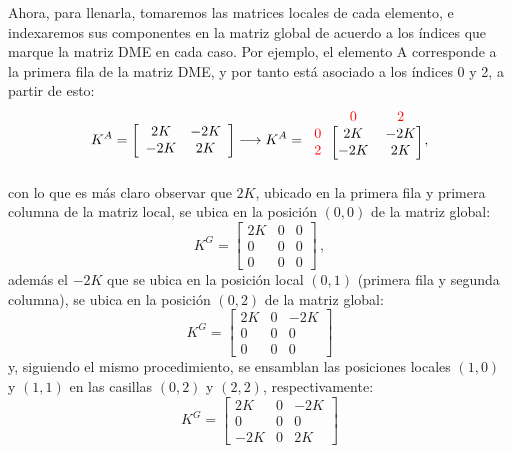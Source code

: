Ahora, para llenarla, tomaremos las matrices locales de cada elemento, e 
indexaremos sus componentes en la matriz global de acuerdo a los índices que 
marque la matriz DME en cada caso. Por ejemplo, el elemento A corresponde a la 
primera fila de la matriz DME, y por tanto está asociado a los índices 0 y 2, a 
partir de esto: 
\[K^A =
\left[\begin{array}{cc}
2K &-2K\\
-2K &2K\\
\end{array}\right]
\longrightarrow
K^A =
\begin{blockarray}{ccc}
&\color{red}{0} &\color{red}{2}\\
\begin{block}{c[cc]}
\color{red}{0} &2K &-2K\\
\color{red}{2} &-2K &2K\\
\end{block}
\end{blockarray}  ,\]
con lo que es más claro observar que $2K$, ubicado en la primera fila y 
primera columna de la matriz local, se ubica en la posición $(0,0)$ de la 
matriz global:
$$K^G = 
\begin{bmatrix}
2K & 0 & 0 \\
0 & 0 & 0 \\
0 & 0 & 0 
\end{bmatrix}\, ,
$$
además el $-2K$ que se ubica en la posición local $(0,1)$ (primera fila y 
segunda columna), se ubica en la posición $(0,2)$ de la matriz global:
$$K^G = 
\begin{bmatrix}
2K & 0 & -2K \\
0 & 0 & 0 \\
0 & 0 & 0 
\end{bmatrix}
$$
y, siguiendo el mismo procedimiento, se ensamblan las posiciones locales 
$(1,0)$ y $(1,1)$ en las casillas $(0,2)$ y $(2,2)$, respectivamente:
$$K^G = 
\begin{bmatrix}
2K & 0 & -2K \\
0 & 0 & 0 \\
-2K & 0 & 2K 
\end{bmatrix}
$$

